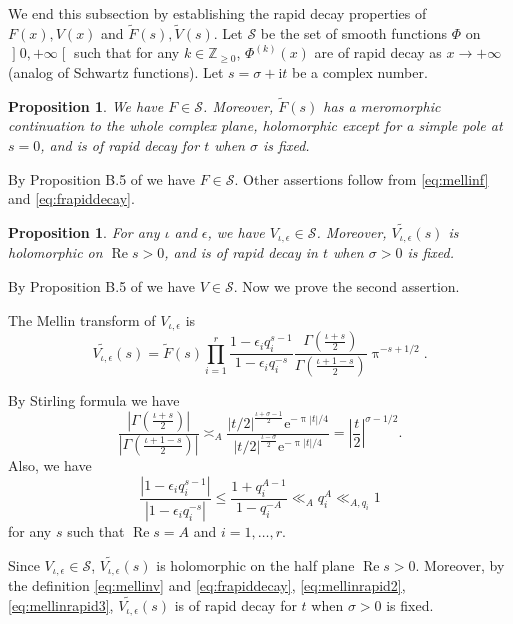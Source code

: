 \documentclass[10pt,oneside,reqno]{amsart}
\makeatletter
\newcommand\lopen{\mathopen{]}}
\newcommand\ropen{\mathclose{[}}
\newcommand\rme{\mathrm{e}}
\newcommand\rmi{\mathrm{i}}
\newcommand\cS{\mathcal{S}}
\newcommand\ZZ{\mathbb{Z}}
\renewcommand\Re{\mathop{\mathrm{Re}}}
\renewcommand\leq{\leqslant}
\renewcommand\geq{\geqslant}
\theoremstyle{THEOREM}
\newtheorem{proposition}[theorem]{Proposition}
\theoremstyle{DEFINITION}
\theoremstyle{EXERCISE}
\numberwithin{equation}{section}
\renewenvironment{proof}[1][\proofname]{\par
  \vspace{-6pt}
  \pushQED{\qed}
  \normalfont \topsep6\p@\@plus6\p@\relax
  \trivlist
  \item[\hskip\labelsep\rmfamily\bfseries
    #1\@addpunct{:}]\ignorespaces
}{
  \popQED\endtrivlist\@endpefalse
  \vspace{-6pt}
}
\makeatother
\begin{document}
We end this subsection by establishing the rapid decay properties of 
$F(x), V(x)$ and $\widetilde{F}(s), \widetilde{V}(s)$.  Let $\cS$ be the set of smooth functions $\Phi$ on $\lopen 0,+\infty\ropen$ such that for any $k\in \ZZ_{\geq 0}$, $\Phi^{(k)}(x)$ are of rapid decay as $x\to +\infty$ (analog of Schwartz functions). Let $s=\sigma+\rmi t $ be a complex number.
\begin{proposition}\label{prop:propertyf}
We have $F\in \cS$. Moreover, $\widetilde{F}(s)$ has a meromorphic continuation to the whole complex plane, holomorphic except for a simple pole at $s=0$, and is of rapid decay for $t$ when $\sigma$ is fixed.
\end{proposition}
\begin{proof}
By Proposition B.5 of \cite{cheng2025} we have $F\in \cS$. Other assertions follow from \eqref{eq:mellinf} and \eqref{eq:frapiddecay}.
\end{proof}
\begin{proposition}\label{prop:propertyh}
For any $\iota$ and $\epsilon$, we have $V_{\iota,\epsilon}\in \cS$. Moreover, $\widetilde{V_{\iota,\epsilon}}(s)$ is holomorphic on $\Re s>0$, and is of rapid decay in $t$ when $\sigma>0$ is fixed.
\end{proposition}
\begin{proof}
By Proposition B.5 of \cite{cheng2025} we have $V\in \cS$. Now we prove the second assertion.

The Mellin transform of $V_{\iota,\epsilon}$ is
\begin{equation}\label{eq:mellinv}
\widetilde{V_{\iota,\epsilon}}(s)=\widetilde{F}(s)\prod_{i=1}^{r}\frac{1-\epsilon_i q_i^{s-1}}{1-\epsilon_i q_i^{-s}}\frac{\Gamma(\frac{\iota+s}{2})}{\Gamma(\frac{\iota+1-s}{2})}\uppi^{-s+1/2}.
\end{equation}

By Stirling formula \cite[Chapter II.0]{tenenbaum2015analytic} we have
\begin{equation}\label{eq:mellinrapid2}
\frac{|\Gamma(\frac{\iota+s}{2})|}{|\Gamma(\frac{\iota+1-s}{2})|}\asymp_A \frac{|t/2|^{\frac{\iota+\sigma-1}{2}}\rme^{-\uppi|t|/4}}{|t/2|^{\frac{\iota-\sigma}{2}} \rme^{-\uppi|t|/4}}=\left|\frac{t}{2}\right|^{\sigma-1/2}.
\end{equation}
Also, we have
\begin{equation}\label{eq:mellinrapid3}
\frac{|1-\epsilon_i q_i^{s-1}|}{|1-\epsilon_i q_i^{-s}|}\leq \frac{1+q_i^{A-1}}{1-q_i^{-A}}\ll_A q_i^A\ll_{A,q_i} 1
\end{equation}
for any $s$ such that $\Re s=A$ and $i=1,\dots,r$. 

Since $V_{\iota,\epsilon}\in \cS$, $\widetilde{V_{\iota,\epsilon}}(s)$ is holomorphic on the half plane $\Re s>0$.
Moreover, by the definition \eqref{eq:mellinv} and \eqref{eq:frapiddecay}, \eqref{eq:mellinrapid2}, \eqref{eq:mellinrapid3}, $\widetilde{V_{\iota,\epsilon}}(s)$ is of rapid decay for $t$ when $\sigma>0$ is fixed. 
\end{proof}
\end{document}
